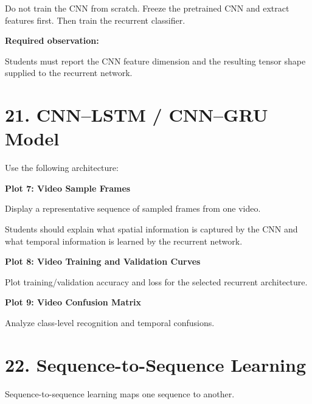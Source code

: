 \documentclass[10pt]{article}
\begin{document}
Do not train the CNN from scratch. Freeze the pretrained CNN and extract
features first. Then train the recurrent classifier.

\textbf{Required observation:}

Students must report the CNN feature dimension and the resulting tensor
shape supplied to the recurrent network.

\section*{21. CNN--LSTM / CNN--GRU Model}

Use the following architecture:

\begin{center}
\end{center}

\textbf{Plot 7: Video Sample Frames}

Display a representative sequence of sampled frames from one video.

Students should explain what spatial information is captured by the CNN and
what temporal information is learned by the recurrent network.

\textbf{Plot 8: Video Training and Validation Curves}

Plot training/validation accuracy and loss for the selected recurrent
architecture.

\textbf{Plot 9: Video Confusion Matrix}

Analyze class-level recognition and temporal confusions.

\section*{22. Sequence-to-Sequence Learning}

Sequence-to-sequence learning maps one sequence to another.
\end{document}
